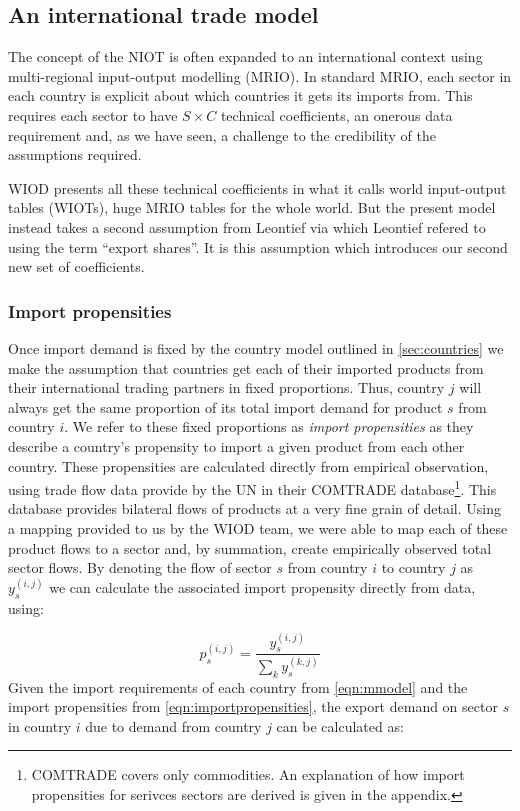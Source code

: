 \documentclass[a4paper]{article}
\begin{document}
\subsection{An international trade model}\label{sec:trade}
The concept of the NIOT is often expanded to an international context using multi-regional input-output modelling (MRIO). In standard MRIO, each sector in each country is explicit about which countries it gets its imports from. 
This requires each sector to have $S \times C$ technical coefficients, an onerous data requirement and, as we have seen, a challenge to the credibility of the assumptions required. 

WIOD presents all these technical coefficients in what it calls world input-output tables (WIOTs), huge MRIO tables for the whole world.
But the present model instead takes a second assumption from Leontief via \textcite{duchin_international_2004} which Leontief refered to using the term ``export shares''.
It is this assumption which introduces our second new set of coefficients.

\subsubsection*{Import propensities}
Once import demand is fixed by the country model outlined in \cref{sec:countries} we make the assumption that countries get each of their imported products from their international trading partners in fixed proportions.
Thus, country $j$ will always get the same proportion of its total import demand for product $s$ from country $i$.
We refer to these fixed proportions as \textit{import propensities} as they describe a country's propensity to import a given product from each other country.
These propensities are calculated directly from empirical observation, using trade flow data provide by the UN in their COMTRADE database\footnote{COMTRADE covers only commodities. An explanation of how import propensities for serivces sectors are derived is given in the appendix.}.
This database provides bilateral flows of products at a very fine grain of detail.
Using a mapping provided to us by the WIOD team, we were able to map each of these product flows to a sector and, by summation, create empirically observed total sector flows.
By denoting the flow of sector $s$ from country $i$ to country $j$ as $y_s^{(i,j)}$ we can calculate the associated import propensity directly from data, using:

\begin{equation}\label{eqn:importpropensities}
p^{(i,j)}_s = \frac{y^{(i,j)}_s}{\sum_k{y^{(k,j)}_s}}
\end{equation}
Given the import requirements of each country from \cref{eqn:mmodel} and the import propensities from \cref{eqn:importpropensities}, the export demand on sector $s$ in country $i$ due to demand from country $j$ can be calculated as:
\end{document}
